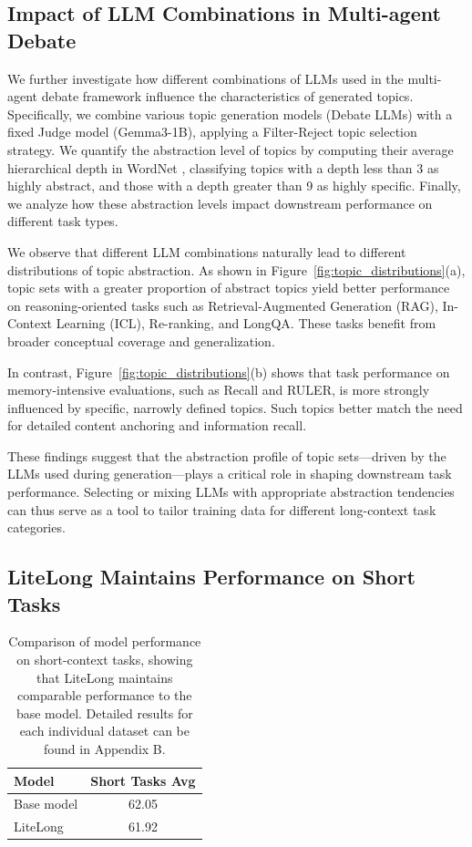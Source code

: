 \documentclass{article}
\theoremstyle{plain}
\theoremstyle{definition}
\theoremstyle{remark}
\begin{document}
\subsection{Impact of LLM Combinations in Multi-agent Debate}

    We further investigate how different combinations of LLMs used in the multi-agent debate framework influence the characteristics of generated topics. Specifically, we combine various topic generation models (Debate LLMs) with a fixed Judge model (Gemma3-1B), applying a Filter-Reject topic selection strategy. We quantify the abstraction level of topics by computing their average hierarchical depth in WordNet \cite{miller1995wordnet}, classifying topics with a depth less than 3 as highly abstract, and those with a depth greater than 9 as highly specific. Finally, we analyze how these abstraction levels impact downstream performance on different task types.

    We observe that different LLM combinations naturally lead to different distributions of topic abstraction. As shown in Figure~\ref{fig:topic_distributions}(a), topic sets with a greater proportion of abstract topics yield better performance on reasoning-oriented tasks such as Retrieval-Augmented Generation (RAG), In-Context Learning (ICL), Re-ranking, and LongQA. These tasks benefit from broader conceptual coverage and generalization.
    
    In contrast, Figure~\ref{fig:topic_distributions}(b) shows that task performance on memory-intensive evaluations, such as Recall and RULER, is more strongly influenced by specific, narrowly defined topics. Such topics better match the need for detailed content anchoring and information recall.
    
    These findings suggest that the abstraction profile of topic sets—driven by the LLMs used during generation—plays a critical role in shaping downstream task performance. Selecting or mixing LLMs with appropriate abstraction tendencies can thus serve as a tool to tailor training data for different long-context task categories.

\subsection{LiteLong Maintains Performance on Short Tasks}

    \begin{table}[tbp]
        \centering
        \small
        \begin{tabular}{lc}
            \toprule
            
            \textbf{Model} & \textbf{Short Tasks Avg} \\
            \hline
            Base model & 62.05 \\
            LiteLong & 61.92 \\
            \hline
        \end{tabular}
        \caption{Comparison of model performance on short-context tasks, showing that LiteLong maintains comparable performance to the base model. Detailed results for each individual dataset can be found in Appendix B.}
        \label{tab:short_context_results}
    \end{table}
\end{document}
